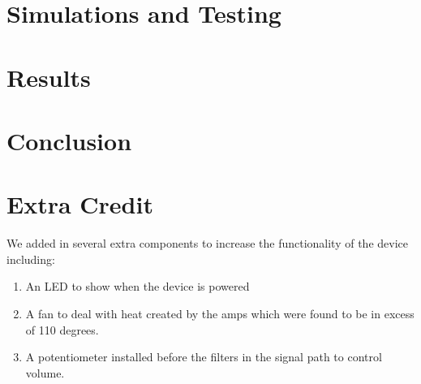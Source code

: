 \documentclass{article}
\begin{document}
\section*{Simulations and Testing}

\section*{Results}

\section*{Conclusion}

\section*{Extra Credit}
We added in several extra components to increase the functionality of the 
device including:
\begin{enumerate}
\item An LED to show when the device is powered
\item A fan to deal with heat created by the amps which were found to be in
 excess of 110 degrees.
\item A potentiometer installed before the filters in the signal path to 
control volume.
\end{enumerate}
\end{document}
